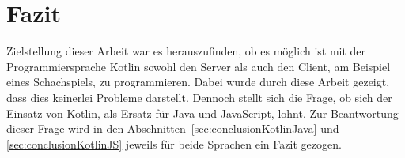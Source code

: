 
\chapter{Fazit}\label{chap:conclusion}
Zielstellung dieser Arbeit war es herauszufinden, ob es möglich ist mit der Programmiersprache Kotlin sowohl den Server als auch den Client, am Beispiel eines Schachspiels, zu programmieren. Dabei wurde durch diese Arbeit gezeigt, dass dies keinerlei Probleme darstellt. Dennoch stellt sich die Frage, ob sich der Einsatz von Kotlin, als Ersatz für Java und JavaScript, lohnt. Zur Beantwortung dieser Frage wird in den \hyperref[sec:conclusionKotlinJava, sec:conclusionKotlinJS]{Abschnitten~\ref{sec:conclusionKotlinJava} und \ref{sec:conclusionKotlinJS}} jeweils für beide Sprachen ein Fazit gezogen.

